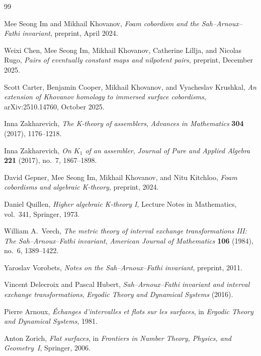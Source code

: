 \documentclass[12pt, a4paper]{article}
\theoremstyle{plain}
\theoremstyle{definition}
\theoremstyle{correspondence}
\begin{document}
\begin{thebibliography}{99}


Mee Seong Im and Mikhail Khovanov,
\textit{Foam cobordism and the Sah--Arnoux--Fathi invariant},
preprint, April 2024.

Weixi Chen, Mee Seong Im, Mikhail Khovanov, Catherine Lillja, and Nicolas Rugo,
\textit{Pairs of eventually constant maps and nilpotent pairs},
preprint, December 2025.

Scott Carter, Benjamin Cooper, Mikhail Khovanov, and Vyacheslav Krushkal,
\textit{An extension of Khovanov homology to immersed surface cobordisms},
arXiv:2510.14760, October 2025.


Inna Zakharevich,
\textit{The K-theory of assemblers},
\textit{Advances in Mathematics} \textbf{304} (2017), 1176--1218.

Inna Zakharevich,
\textit{On $K_1$ of an assembler},
\textit{Journal of Pure and Applied Algebra} \textbf{221} (2017), no.~7, 1867--1898.

David Gepner, Mee Seong Im, Mikhail Khovanov, and Nitu Kitchloo,
\textit{Foam cobordisms and algebraic K-theory},
preprint, 2024.

Daniel Quillen,
\textit{Higher algebraic K-theory I},
Lecture Notes in Mathematics, vol.~341,
Springer, 1973.


William A.~Veech,
\textit{The metric theory of interval exchange transformations III:
The Sah--Arnoux--Fathi invariant},
\textit{American Journal of Mathematics} \textbf{106} (1984), no.~6, 1389--1422.

Yaroslav Vorobets,
\textit{Notes on the Sah--Arnoux--Fathi invariant},
preprint, 2011.

Vincent Delecroix and Pascal Hubert,
\textit{Sah--Arnoux--Fathi invariant and interval exchange transformations},
\textit{Ergodic Theory and Dynamical Systems} (2016).

Pierre Arnoux,
\textit{{\'E}changes d'intervalles et flots sur les surfaces},
in \textit{Ergodic Theory and Dynamical Systems}, 1981.

Anton Zorich,
\textit{Flat surfaces},
in \textit{Frontiers in Number Theory, Physics, and Geometry~I},
Springer, 2006.


\end{thebibliography}
\end{document}

